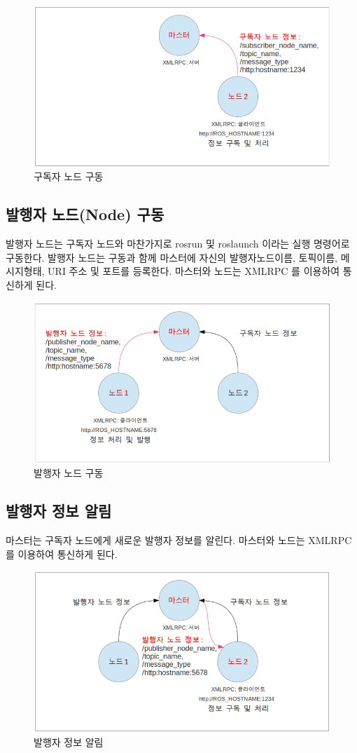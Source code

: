 \begin{figure}[h]
\centering\includegraphics[width=0.6\columnwidth]{pictures/chapter4/notion2.png}
\caption{구독자 노드 구동}
\end{figure}

\subsection{발행자 노드(Node) 구동}

발행자 노드는 구독자 노드와 마찬가지로 rosrun 및 roslaunch 이라는 실행 명령어로 구동한다. 발행자 노드는 구동과 함께 마스터에 자신의 발행자노드이름, 토픽이름, 메시지형태, URI 주소 및 포트를 등록한다. 마스터와 노드는 XMLRPC 를 이용하여 통신하게 된다.

\begin{figure}[h]
\centering\includegraphics[width=0.6\columnwidth]{pictures/chapter4/notion3.png}
\caption{발행자 노드 구동}
\end{figure}

\subsection{발행자 정보 알림}

마스터는 구독자 노드에게 새로운 발행자 정보를 알린다. 마스터와 노드는 XMLRPC 를 이용하여 통신하게 된다.

\begin{figure}[h]
\centering\includegraphics[width=0.6\columnwidth]{pictures/chapter4/notion4.png}
\caption{발행자 정보 알림}
\end{figure}

